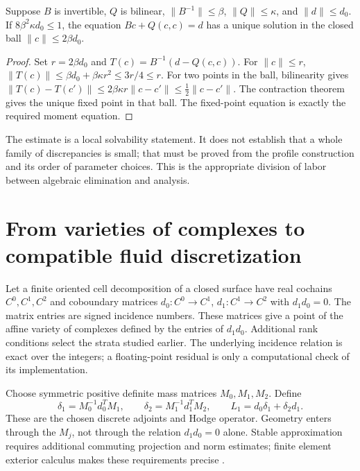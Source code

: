 \begin{lemma}
\label{lem:fluid-quadratic-moments}
Suppose $B$ is invertible, $Q$ is bilinear, $\|B^{-1}\|\le\beta$, $\|Q\|\le\kappa$, and $\|d\|\le d_0$. If $8\beta^2\kappa d_0\le1$, the equation $Bc+Q(c,c)=d$ has a unique solution in the closed ball $\|c\|\le2\beta d_0$.
\end{lemma}
\begin{proof}
Set $r=2\beta d_0$ and $T(c)=B^{-1}(d-Q(c,c))$. For $\|c\|\le r$,
$\|T(c)\|\le\beta d_0+\beta\kappa r^2\le3r/4\le r$.
For two points in the ball, bilinearity gives
$\|T(c)-T(c')\|\le2\beta\kappa r\|c-c'\|\le\tfrac12\|c-c'\|$.
The contraction theorem gives the unique fixed point in that ball. The fixed-point equation is exactly the required moment equation.
\end{proof}

The estimate is a local solvability statement. It does not establish that a whole family of discrepancies is small; that must be proved from the profile construction and its order of parameter choices. This is the appropriate division of labor between algebraic elimination and analysis.

\section{From varieties of complexes to compatible fluid discretization}

Let a finite oriented cell decomposition of a closed surface have real cochains $C^0,C^1,C^2$ and coboundary matrices
$d_0:C^0\to C^1$, $d_1:C^1\to C^2$ with $d_1d_0=0$. The matrix entries are signed incidence numbers. These matrices give a point of the affine variety of complexes defined by the entries of $d_1d_0$. Additional rank conditions select the strata studied earlier. The underlying incidence relation is exact over the integers; a floating-point residual is only a computational check of its implementation.

Choose symmetric positive definite mass matrices $M_0,M_1,M_2$. Define
\[
 \delta_1=M_0^{-1}d_0^TM_1,\qquad
 \delta_2=M_1^{-1}d_1^TM_2,\qquad
 L_1=d_0\delta_1+\delta_2d_1.
\]
These are the chosen discrete adjoints and Hodge operator. Geometry enters through the $M_j$, not through the relation $d_1d_0=0$ alone. Stable approximation requires additional commuting projection and norm estimates; finite element exterior calculus makes these requirements precise \cite{NSFEEC2006,NSFEEC2010}.

